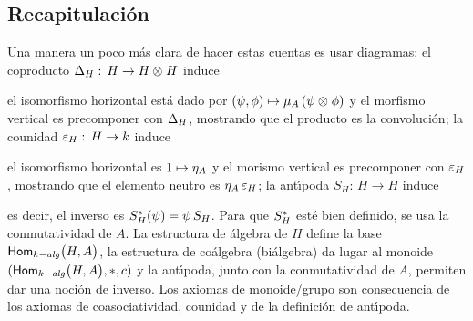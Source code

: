 \theoremstyle{plain}
\newtheorem{teoEquivalencia}{Teorema}[section]
\newtheorem{coroGrupoDeMorfismos}[teoEquivalencia]{Corolario}
\newtheorem{propoYoneda}[teoEquivalencia]{Proposici\'{o}n}
\newtheorem{teoMorfismoDeGrupos}[teoEquivalencia]{Teorema}

\theoremstyle{definition}
\newtheorem{obsGrupoDeMorfismos}[teoEquivalencia]{Observaci\'{o}n}
\newtheorem{obsProductosEnGrupos}[teoEquivalencia]{Observaci\'{o}n}
\newtheorem{obsRepresentabilidad}[teoEquivalencia]{Observaci\'{o}n}


\subsection{Recapitulaci\'{o}n}\label{subsec:gruposafines:recap}

Una manera un poco m\'{a}s clara de hacer estas cuentas es usar diagramas:
el coproducto $\coproducto[H]:\,H\rightarrow H\tensor H$ induce
\begin{center}
\end{center}
el isomorfismo horizontal est\'{a} dado por
$(\psi,\phi)\mapsto\producto[A]\,(\psi\tensor\phi)$ y el morfismo vertical es
precomponer con $\coproducto[H]$, mostrando que el producto es la
convoluci\'{o}n; la counidad $\counidad[H]:\,H\rightarrow k$ induce
\begin{center}
\end{center}
el isomorfismo horizontal es $1\mapsto\unidad[A]$ y el morismo vertical es
precomponer con $\counidad[H]$, mostrando que el elemento neutro es
$\unidad[A]\,\counidad[H]$; la ant\'{\i}poda $S_H:\,H\rightarrow H$ induce
\begin{center}
\end{center}
es decir, el inverso es $\pull S_H(\psi)=\psi\,S_H$. Para que $\pull S_H$
est\'{e} bien definido, se usa la conmutatividad de $A$. La estructura de
\'{a}lgebra de $H$ define la base $\Homalg\big(H,A\big)$, la estructura de
co\'{a}lgebra (bi\'{a}lgebra) da lugar al monoide
$(\Homalg\big(H,A\big),\convol,c)$ y la ant\'{\i}poda, junto con la
conmutatividad de $A$, permiten dar una noci\'{o}n de inverso. Los axiomas de
monoide/grupo son consecuencia de los axiomas de coasociatividad, counidad y de
la definici\'{o}n de ant\'{\i}poda.

